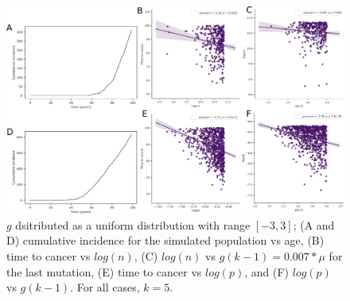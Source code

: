 \documentclass[9pt,twocolumn,twoside]{pnas-new}
\begin{document}
\begin{figure}[tbhp]
	\centering
	\includegraphics[width=.8\linewidth]{figS4.png}
	\caption{$g$ dsitributed as a uniform distribution with range $[-3, 3]$; (A and D) cumulative incidence for the simulated population vs age, (B) time to cancer vs $log(n)$, (C) $log(n)$ vs $g(k-1)=0.007*\mu$ for the last mutation, (E) time to cancer vs $log(p)$, and (F) $log(p)$ vs $g(k-1)$. For all cases, $k=5$.}
	\label{figS4}
\end{figure}
\end{document}
